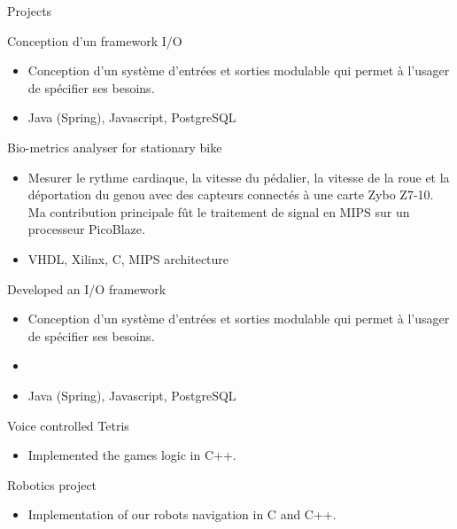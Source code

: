 \documentclass{article}
\newlength{\tabin}
\newlength{\secsep}
\newcommand{\lineunder}{\vspace*{-8pt} \\ \hspace*{-6pt} \hrulefill \\ \vspace*{-15pt}}
\newenvironment{tabbedsection}[1]{
  \begin{list}{}{
      \setlength{\itemsep}{0pt}
      \setlength{\labelsep}{0pt}
      \setlength{\labelwidth}{0pt}
      \setlength{\leftmargin}{\tabin}
      \setlength{\rightmargin}{\tabin}
      \setlength{\listparindent}{0pt}
      \setlength{\parsep}{0pt}
      \setlength{\parskip}{0pt}
      \setlength{\partopsep}{0pt}
      \setlength{\topsep}{#1}
    }
  \item[]
}{\end{list}}
\newenvironment{resume_section}[1]{
  \filbreak
  \vspace{2\secsep}
  \textsc{\large#1}
  \lineunder
  \begin{tabbedsection}{\secsep}
}{\end{tabbedsection}}
\newenvironment{resume_subsection}[2][]{
  \textbf{#2} \hfill {\footnotesize #1} \hspace{2em}
  \begin{tabbedsection}{0.5\secsep}
}{\end{tabbedsection}}
\newenvironment{subitems}{
  \renewcommand{\labelitemi}{-}
  \begin{itemize}
      \setlength{\labelsep}{1em}
}{\end{itemize}}
\begin{document}
\begin{resume_section}{Projects}
  \begin{resume_subsection}[Fall 2019]{Conception d'un framework I/O}
  \begin{subitems}
    \item Conception d’un système d’entrées et sorties modulable qui permet à l’usager de spécifier ses besoins.
    \item Java (Spring), Javascript, PostgreSQL
    \end{subitems}
  \end{resume_subsection}
  
  \begin{resume_subsection}[Winter 2019]{Bio-metrics analyser for stationary bike}
  \begin{subitems}
    \item Mesurer le rythme cardiaque, la vitesse du pédalier, la vitesse de la roue et la déportation du genou avec des capteurs connectés à une carte Zybo Z7-10. Ma contribution principale fût le traitement de signal en MIPS sur un processeur PicoBlaze.
    \item VHDL, Xilinx, C, MIPS architecture
    \end{subitems}
  \end{resume_subsection}

  \begin{resume_subsection}[Summer 2018]{Developed an I/O framework}
  \begin{subitems}
    \item Conception d’un système d’entrées et sorties modulable qui permet à l’usager de spécifier ses besoins.
    \item 
    \item Java (Spring), Javascript, PostgreSQL
    \end{subitems}
  \end{resume_subsection}

  \begin{resume_subsection}[Winter 2018]{Voice controlled Tetris}
    \begin{subitems}
        \item Implemented the games logic in C++.
    \end{subitems}
  \end{resume_subsection}
  
  \begin{resume_subsection}[Fall 2017]{Robotics project}
    \begin{subitems}
    \item Implementation of our robots navigation in C and C++.
    \end{subitems}
  \end{resume_subsection}
\end{resume_section}
\end{document}
